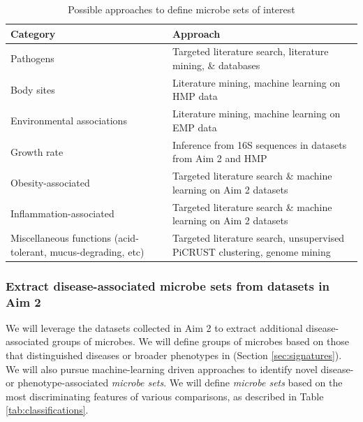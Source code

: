 \documentclass[12pt]{article}
\begin{document}
\begin{table}
\begin{tabular}{|p{6cm}|p{10cm}|}
	\hline
	\textbf{Category} & \textbf{Approach} \\
	\hline
	Pathogens & Targeted literature search, literature mining, \& databases \\
	\hline
	Body sites & Literature mining, machine learning on HMP data \\
	\hline
	Environmental associations & Literature mining, machine learning on EMP data \\
	\hline
	Growth rate & Inference from 16S sequences in datasets from Aim 2 and HMP \\
	\hline
	Obesity-associated & Targeted literature search \& machine learning on Aim 2 datasets \\
	\hline
	Inflammation-associated & Targeted literature search \& machine learning on Aim 2 datasets \\
	\hline
	Miscellaneous functions (acid-tolerant, mucus-degrading, etc) & Targeted literature search, unsupervised PiCRUST clustering, genome mining \\
	\hline 
\end{tabular}
\caption{Possible approaches to define microbe sets of interest}\label{tab:microbe_set_categories}
\end{table}


\subsubsection{Extract disease-associated microbe sets from datasets in Aim 2}
We will leverage the datasets collected in Aim 2 to extract additional disease-associated groups of microbes. We will define groups of microbes based on those that distinguished diseases or broader phenotypes in (Section \ref{sec:signatures}). We will also pursue machine-learning driven approaches to identify novel disease- or phenotype-associated \textit{microbe sets}. We will define \textit{microbe sets} based on the most discriminating features of various comparisons, as described in Table \ref{tab:classifications}.
\end{document}
